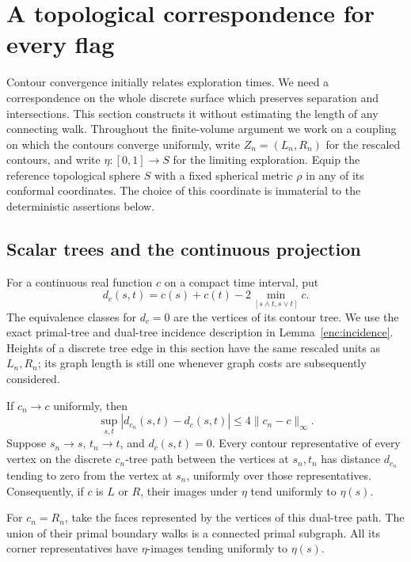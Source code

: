 \section{A topological correspondence for every flag}
\label{top:section}

Contour convergence initially relates exploration times.  We need a
correspondence on the whole discrete surface which preserves separation
and intersections.  This section constructs it without estimating the
length of any connecting walk.  Throughout the finite-volume argument we
work on a coupling on which the contours converge uniformly, write
$Z_n=(L_n,R_n)$ for the rescaled contours, and write
$\eta:[0,1]\to S$ for the limiting exploration.  Equip the reference
topological sphere $S$ with a fixed spherical metric $\rho$ in any of its
conformal coordinates.  The choice of this coordinate is immaterial to
the deterministic assertions below.

\subsection{Scalar trees and the continuous projection}

For a continuous real function $c$ on a compact time interval, put
\begin{equation}\label{top:tree-pseudometric}
 d_c(s,t)=c(s)+c(t)-2\min_{[s\wedge t,s\vee t]}c.
\end{equation}
The equivalence classes for $d_c=0$ are the vertices of its contour tree.
We use the exact primal-tree and dual-tree incidence description in
Lemma~\ref{enc:incidence}.  Heights of a discrete tree edge in this
section have the same rescaled units as $L_n,R_n$; its graph length is
still one whenever graph costs are subsequently considered.

\begin{lemma}\label{top:scalar-trees}
If $c_n\to c$ uniformly, then
\[
 \sup_{s,t}|d_{c_n}(s,t)-d_c(s,t)|
 \le 4\|c_n-c\|_\infty.
\]
Suppose $s_n\to s$, $t_n\to t$, and $d_c(s,t)=0$.
Every contour representative of every vertex on the discrete
$c_n$-tree path between the vertices at $s_n,t_n$ has distance
$d_{c_n}$ tending to zero from the vertex at $s_n$, uniformly over those
representatives.  Consequently, if $c$ is $L$ or $R$, their images under
$\eta$ tend uniformly to $\eta(s)$.

For $c_n=R_n$, take the faces represented by the vertices of this
dual-tree path.  The union of their primal boundary walks is a connected
primal subgraph.  All its corner representatives have $\eta$-images
tending uniformly to $\eta(s)$.
\end{lemma}

